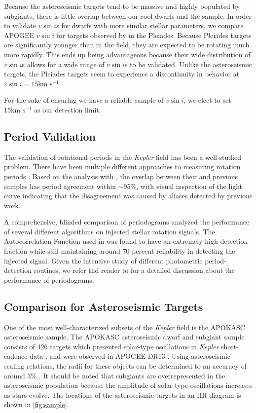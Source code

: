 \documentclass[manuscript]{aastex6}
\newcommand{\vsini}{\ensuremath{v \sin i}}
\newcommand{\Kepler}{\mbox{\textit{Kepler}}}
\newcommand{\kms}{\textrm{km~s}\ensuremath{^{-1}}}
\newcommand{\gvs}{\authorcomment1}
\begin{document}
Because the asteroseismic targets tend to be massive and highly populated by
subgiants, there is little overlap between our cool dwarfs and the 
\citet{Bruntt12} sample. In order to validate \vsini{}s for dwarfs with more
similar stellar parameters, we compare
APOGEE \vsini{} for targets observed by \citet{Stauffer87} in the
Pleiades. Because Pleiades targets are significantly younger than in the field,
they are expected to be rotating much more rapidly. This ends up being
advantageous because their wide
distribution of \vsini{}s allows for a wide range of \vsini{}s to be validated. 
Unlike the asteroseismic targets, the Pleiades targets seem to experience a
discontinuity in behavior at \(\vsini = 15 \kms\). \gvs{Check that scatter above
is consistent with 10\%}

For the sake of ensuring we have a reliable sample of \vsini{}, we elect to set
\(15 \kms\) as our detection limit.

\subsection{Period Validation}

The validation of rotational periods in the \Kepler{} field has been a
well-studied problem. There have been multiple different approaches to
measuring rotation periods \citep{Reinhold13,Nielsen13,McQuillan14,Garcia14}.
Based on the analysis with \citet{McQuillan14}, the overlap between their
and previous samples has period agreement within \(\sim\)95\%, with visual 
inspection of the light curve indicating that the disagreement was caused by
aliases detected by previous work. 

A comprehensive, blinded comparison of periodograms analyzed the performance of
several different algorithms \citet{Aigrain15} on injected stellar rotation
signals. The Autocorrelation Function used in \citet{McQuillan14} was found to
have an extremely high detection fraction while still maintaining around 70
percent reliability in detecting the injected signal. Given the intensive study
of different photometric period-detection routines, we refer thd reader to
\citep{Aigrain15} for a detailed discussion about the performance of
periodograms.

\subsection{Comparison for Asteroseismic Targets}
\label{sec:astero}


One of the most well-characterized subsets of the \Kepler{} field is the
APOKASC asteroseismic sample. The APOKASC asteroseismic dwarf and subgiant 
sample consists of 426 targets which presented solar-type oscillations in 
\Kepler{} short-cadence data \citep{Chaplin11}, and were observed in APOGEE DR13
\citep{Majewski17}. Using asteroseismic scaling relations, the radii
for these objects can be determined to an accuracy of around 3\%
\citep{Serenelli17}. It should be noted that subgiants are overrepresented in
the asteroseismic population because the amplitude of solar-type oscillations 
increases as stars evolve. The locations of the asteroseismic targets in an HR
diagram is shown in \cref{fig:sample}.
\end{document}
